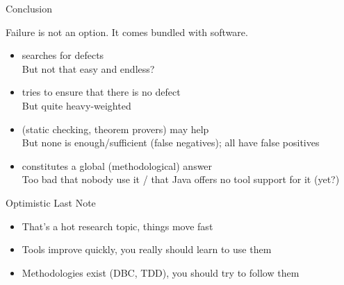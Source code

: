 \begin{frame}{Conclusion}
  \begin{block}{Failure is not an option.
It comes bundled with software.}
    \begin{itemize}
    \item {} searches for defects\\
      {\small But not that easy and endless?}
    \item {} tries to ensure that there is no defect\\
      {\small But quite heavy-weighted}
    \item {} (static checking, theorem provers) may help\\
      {\small But none is enough/sufficient (false negatives); all have false positives}
    \item {} constitutes a global (methodological) answer\\
      {\small Too bad that nobody use it / that Java offers no tool support for
        it (yet?)}
    \end{itemize}
  \end{block}

  \begin{block}{Optimistic Last Note}
    \begin{itemize}
    \item That's a hot research topic, things move fast
    \item Tools improve quickly, you really should learn to use them
    \item Methodologies exist {\small(DBC, TDD)}, you should try to follow them
    \end{itemize}
  \end{block}
\end{frame}
